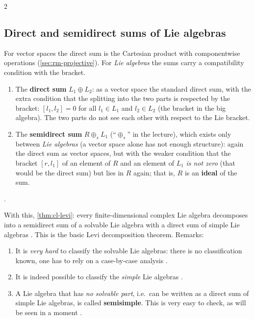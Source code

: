 \begin{paracol}{2}
\subsection{Direct and semidirect sums of Lie algebras}\label{sec:cl-sums}
\begin{definition}\label{def:cl-sums}
For vector spaces the direct sum is the Cartesian product with componentwise operations (\cref{sec:rm-projective}). For \emph{Lie algebras} the sums carry a compatibility condition with the bracket.
\begin{enumerate}
  \item[(a)] The \textbf{direct sum} $L_1\oplus L_2$: as a vector space the standard direct sum, with the extra condition that the splitting into the two parts is respected by the bracket: $[l_1,l_2]=0$ for all $l_1\in L_1$ and $l_2\in L_2$ (the bracket in the big algebra). The two parts do not see each other with respect to the Lie bracket.
  \item[(b)] The \textbf{semidirect sum} $R\oplus_s L_1$ (``$\oplus_s$'' in the lecture), which exists only between \emph{Lie algebras} (a vector space alone has not enough structure): again the direct sum as vector spaces, but with the weaker condition that the bracket $[r,l_1]$ of an element of $R$ and an element of $L_1$ \emph{is not zero} (that would be the direct sum) but lies in $R$ again; that is, $R$ is an \textbf{ideal} of the sum.
\end{enumerate}
       .
\end{definition}
With this, \cref{thm:cl-levi}: every finite-dimensional complex Lie algebra decomposes into a semidirect sum of a solvable Lie algebra with a direct sum of simple Lie algebras  . This is the basic Levi decomposition theorem. Remarks:
\begin{enumerate}
  \item[(a)] It is \emph{very hard} to classify the solvable Lie algebras: there is no classification known, one has to rely on a case-by-case analysis  .
  \item[(b)] It is indeed possible to classify the \emph{simple} Lie algebras .
  \item[(c)] A Lie algebra that has \emph{no solvable part}, i.e.\ can be written as a direct sum of simple Lie algebras, is called \textbf{semisimple}. This is very easy to check, as will be seen in a moment   .

\end{enumerate}
\end{paracol}
